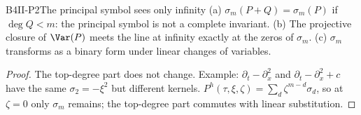 \begin{dimcard}{B4}{II-P2}{The principal symbol sees only infinity}{\pw}{}
(a) $\sigma_m(P+Q)=\sigma_m(P)$ if $\deg Q<m$: the principal symbol is not a complete invariant. (b) The projective closure of $\Var(P)$ meets the line at infinity exactly at the zeros of $\sigma_m$. (c) $\sigma_m$ transforms as a binary form under linear changes of variables.
\end{dimcard}
\begin{proof}
The top-degree part does not change. Example: $\partial_t-\partial_x^2$ and $\partial_t-\partial_x^2+c$ have the same $\sigma_2=-\xi^2$ but different kernels.
$P^h(\tau,\xi,\zeta)=\sum_d\zeta^{m-d}\sigma_d$, so at $\zeta=0$ only $\sigma_m$ remains; the top-degree part commutes with linear substitution.
\end{proof}


